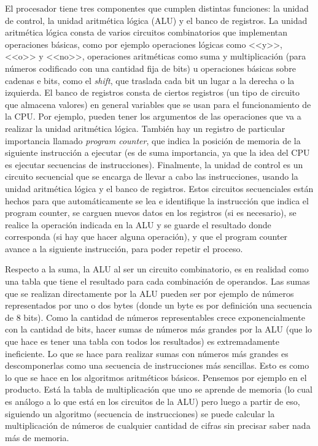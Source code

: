 \documentclass[a4paper, 12pt]{report}
\theoremstyle{definition}
\begin{document}
El procesador tiene tres componentes que cumplen distintas funciones: la unidad de control, la unidad aritmética lógica (ALU) y el banco de registros. La unidad aritmética lógica consta de varios circuitos combinatorios que implementan operaciones básicas, como por ejemplo operaciones lógicas como <<y>>, <<o>> y <<no>>, operaciones aritméticas como suma y multiplicación (para números codificado con una cantidad fija de bits) u operaciones básicas sobre cadenas e bits, como el {\sl shift}, que traslada cada bit un lugar a la derecha o la izquierda. El banco de registros consta de ciertos registros (un tipo de circuito que almacena valores) en general variables que se usan para el funcionamiento de la CPU. Por ejemplo, pueden tener los argumentos de las operaciones que va a realizar la unidad aritmética lógica. También hay un registro de particular importancia llamado {\sl program counter}, que indica la posición de memoria de la siguiente instrucción a ejecutar (es de suma importancia, ya que la idea del CPU es ejecutar secuencias de instrucciones). Finalmente, la unidad de control es un circuito secuencial que se encarga de llevar a cabo las instrucciones, usando la unidad aritmética lógica y el banco de registros. Estos circuitos secuenciales están hechos para que automáticamente se lea e identifique la instrucción que indica el program counter, se carguen nuevos datos en los registros (si es necesario), se realice la operación indicada en la ALU y se guarde el resultado donde corresponda (si hay que hacer alguna operación), y que el program counter avance a la siguiente instrucción, para poder repetir el proceso.

Respecto a la suma, la ALU al ser un circuito combinatorio, es en realidad como una tabla que tiene el resultado para cada combinación de operandos. Las sumas que se realizan directamente por la ALU pueden ser por ejemplo de números representados por uno o dos bytes (donde un byte es por definición una secuencia de 8 bits). Como la cantidad de números representables crece exponencialmente con la cantidad de bits, hacer sumas de números más grandes por la ALU (que lo que hace es tener una tabla con todos los resultados) es extremadamente ineficiente. Lo que se hace para realizar sumas con números más grandes es descomponerlas como una secuencia de instrucciones más sencillas. Esto es como lo que se hace en los algoritmos aritméticos básicos. Pensemos por ejemplo en el producto. Está la tabla de multiplicación que uno se aprende de memoria (lo cual es análogo a lo que está en los circuitos de la ALU) pero luego a partir de eso, siguiendo un algoritmo (secuencia de instrucciones) se puede calcular la multiplicación de números de cualquier cantidad de cifras sin precisar saber nada más de memoria.
\end{document}
